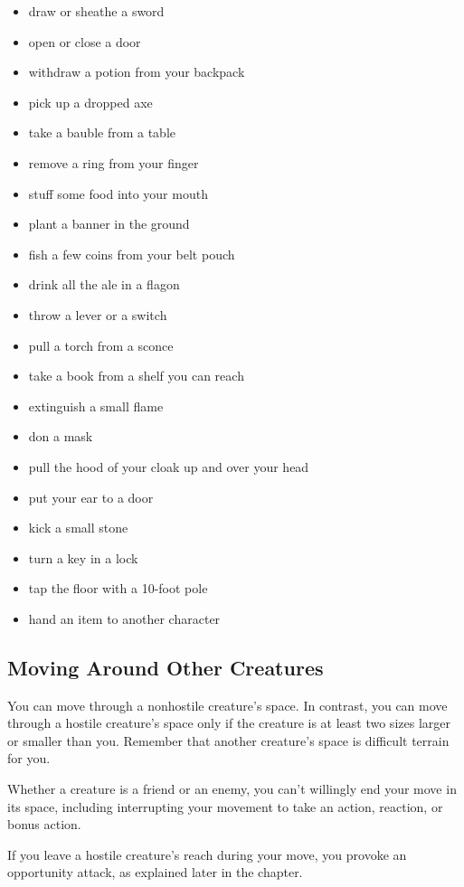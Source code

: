 \begin{itemize}
\item draw or sheathe a sword
\item open or close a door
\item withdraw a potion from your backpack
\item pick up a dropped axe
\item take a bauble from a table
\item remove a ring from your finger
\item stuff some food into your mouth
\item plant a banner in the ground
\item fish a few coins from your belt pouch
\item drink all the ale in a flagon
\item throw a lever or a switch
\item pull a torch from a sconce
\item take a book from a shelf you can reach
\item extinguish a small flame
\item don a mask
\item pull the hood of your cloak up and over your head
\item put your ear to a door
\item kick a small stone
\item turn a key in a lock
\item tap the floor with a 10-foot pole
\item hand an item to another character
\end{itemize}

\subsection{Moving Around Other Creatures}

You can move through a nonhostile creature's space. In contrast, you can move through a hostile creature's space only if the creature is at least two sizes larger or smaller than you. Remember that another creature's space is difficult terrain for you.

Whether a creature is a friend or an enemy, you can't willingly end your move in its space, including interrupting your movement to take an action, reaction, or bonus action.

If you leave a hostile creature's reach during your move, you provoke an opportunity attack, as explained later in the chapter.

